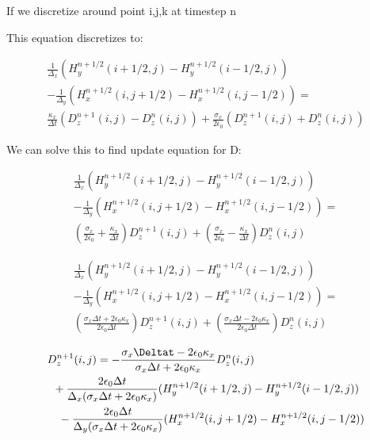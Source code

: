 \documentclass{article}
\begin{document}
If we discretize around point i,j,k at timestep n

This equation discretizes to:

\begin{equation}
\begin{multlined}
  \frac{1}{\Delta_{x}}(H_{y}^{n+1/2}(i+1/2,j)-H_{y}^{n+1/2}(i-1/2,j)) \\
 -\frac{1}{\Delta_{y}}(H_{x}^{n+1/2}(i,j+1/2)-H_{x}^{n+1/2}(i,j-1/2))= \\
  \frac{\kappa_{x}}{\Delta t}
   (D_{z}^{n+1}(i,j)-D_{z}^{n}(i,j))+
   \frac{\sigma_{x}}{2 \epsilon_{0}}
   (D_{z}^{n+1}(i,j)+D_{z}^{n}(i,j))
\end{multlined}
\end{equation}


 We can solve this to find update equation for D:

\begin{equation}
\begin{multlined}
  \frac{1}{\Delta_{x}}(H_{y}^{n+1/2}(i+1/2,j)-H_{y}^{n+1/2}(i-1/2,j)) \\
 -\frac{1}{\Delta_{y}}(H_{x}^{n+1/2}(i,j+1/2)-H_{x}^{n+1/2}(i,j-1/2))= \\
  (\frac{\sigma_{x}}{2\epsilon_{0}}+\frac{\kappa_{x}}{\Delta t})D_{z}^{n+1}(i,j)+
  (\frac{\sigma_{x}}{2\epsilon_{0}}-\frac{\kappa_{x}}{\Delta t})D_{z}^{n}(i,j)
\end{multlined}
\end{equation}

\begin{equation}
\begin{multlined}
  \frac{1}{\Delta_{x}}(H_{y}^{n+1/2}(i+1/2,j)-H_{y}^{n+1/2}(i-1/2,j)) \\
 -\frac{1}{\Delta_{y}}(H_{x}^{n+1/2}(i,j+1/2)-H_{x}^{n+1/2}(i,j-1/2))= \\
  (\frac{\sigma_{x}\Delta t+2\epsilon_{0}\kappa_{x}}{2\epsilon_{0}\Delta t})D_{z}^{n+1}(i,j)+
  (\frac{\sigma_{x}\Delta t-2\epsilon_{0}\kappa_{x}}{2\epsilon_{0}\Delta t})D_{z}^{n}(i,j)
\end{multlined}
\end{equation}

\begin{equation}
\begin{multlined}
  D_{z}^{n+1}(i,j) = -\frac{\sigma_{x}\Deltat-2\epsilon_{0}\kappa_{x}}{\sigma_{x}\Delta t+2\epsilon_{0}\kappa_{x}}D_{z}^{n}(i,j) \\
  +\frac{2\epsilon_{0}\Delta t}{\Delta_{x}(\sigma_{x}\Delta t+2\epsilon_{0}\kappa_{x})}(H_{y}^{n+1/2}(i+1/2,j)-H_{y}^{n+1/2}(i-1/2,j)) \\
 -\frac{2\epsilon_{0}\Delta t}{\Delta_{y}(\sigma_{x}\Delta t+2\epsilon_{0}\kappa_{x})}(H_{x}^{n+1/2}(i,j+1/2)-H_{x}^{n+1/2}(i,j-1/2))
\end{multlined}
\end{equation}
\end{document}

